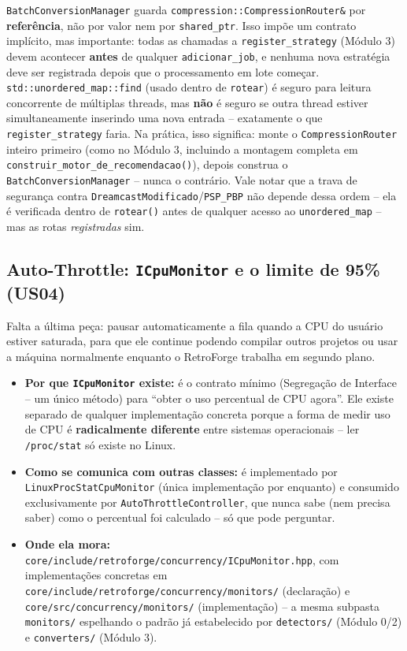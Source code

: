 \begin{CaixaAlerta}
\texttt{BatchConversionManager} guarda \texttt{compression::CompressionRouter\&} por \textbf{referência}, não por valor nem por \texttt{shared\_ptr}. Isso impõe um contrato implícito, mas importante: todas as chamadas a \texttt{register\_strategy} (Módulo 3) devem acontecer \textbf{antes} de qualquer \texttt{adicionar\_job}, e nenhuma nova estratégia deve ser registrada depois que o processamento em lote começar. \texttt{std::unordered\_map::find} (usado dentro de \texttt{rotear}) é seguro para leitura concorrente de múltiplas threads, mas \textbf{não} é seguro se outra thread estiver simultaneamente inserindo uma nova entrada -- exatamente o que \texttt{register\_strategy} faria. Na prática, isso significa: monte o \texttt{CompressionRouter} inteiro primeiro (como no Módulo 3, incluindo a montagem completa em \texttt{construir\_motor\_de\_recomendacao()}), depois construa o \texttt{BatchConversionManager} -- nunca o contrário. Vale notar que a trava de segurança contra \texttt{DreamcastModificado}/\texttt{PSP\_PBP} não depende dessa ordem -- ela é verificada dentro de \texttt{rotear()} antes de qualquer acesso ao \texttt{unordered\_map} -- mas as rotas \textit{registradas} sim.
\end{CaixaAlerta}

\subsection{Auto-Throttle: \texttt{ICpuMonitor} e o limite de 95\% (US04)}

Falta a última peça: pausar automaticamente a fila quando a CPU do usuário estiver saturada, para que ele continue podendo compilar outros projetos ou usar a máquina normalmente enquanto o RetroForge trabalha em segundo plano.

\begin{itemize}
    \item \textbf{Por que \texttt{ICpuMonitor} existe:} é o contrato mínimo (Segregação de Interface -- um único método) para ``obter o uso percentual de CPU agora''. Ele existe separado de qualquer implementação concreta porque a forma de medir uso de CPU é \textbf{radicalmente diferente} entre sistemas operacionais -- ler \texttt{/proc/stat} só existe no Linux.
    \item \textbf{Como se comunica com outras classes:} é implementado por \texttt{LinuxProcStatCpuMonitor} (única implementação por enquanto) e consumido exclusivamente por \texttt{AutoThrottleController}, que nunca sabe (nem precisa saber) como o percentual foi calculado -- só que pode perguntar.
    \item \textbf{Onde ela mora:} \texttt{core/include/retroforge/concurrency/ICpuMonitor.hpp}, com implementações concretas em \texttt{core/include/retroforge/concurrency/monitors/} (declaração) e \texttt{core/src/concurrency/monitors/} (implementação) -- a mesma subpasta \texttt{monitors/} espelhando o padrão já estabelecido por \texttt{detectors/} (Módulo 0/2) e \texttt{converters/} (Módulo 3).
\end{itemize}

